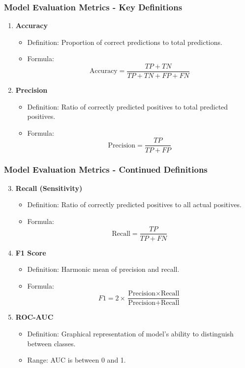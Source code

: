 \documentclass{beamer}
\begin{document}
\begin{frame}[fragile]
    \frametitle{Model Evaluation Metrics - Key Definitions}
    \begin{enumerate}
        \item \textbf{Accuracy}
            \begin{itemize}
                \item Definition: Proportion of correct predictions to total predictions.
                \item Formula: 
                \[
                \text{Accuracy} = \frac{TP + TN}{TP + TN + FP + FN}
                \]
            \end{itemize}
        \item \textbf{Precision}
            \begin{itemize}
                \item Definition: Ratio of correctly predicted positives to total predicted positives.
                \item Formula: 
                \[
                \text{Precision} = \frac{TP}{TP + FP}
                \]
            \end{itemize}
    \end{enumerate}
\end{frame}

\begin{frame}[fragile]
    \frametitle{Model Evaluation Metrics - Continued Definitions}
    \begin{enumerate}
        \setcounter{enumi}{2} %
        \item \textbf{Recall (Sensitivity)}
            \begin{itemize}
                \item Definition: Ratio of correctly predicted positives to all actual positives.
                \item Formula: 
                \[
                \text{Recall} = \frac{TP}{TP + FN}
                \]
            \end{itemize}
        \item \textbf{F1 Score}
            \begin{itemize}
                \item Definition: Harmonic mean of precision and recall.
                \item Formula: 
                \[
                F1 = 2 \times \frac{\text{Precision} \times \text{Recall}}{\text{Precision} + \text{Recall}}
                \]
            \end{itemize}
        \item \textbf{ROC-AUC}
            \begin{itemize}
                \item Definition: Graphical representation of model's ability to distinguish between classes.
                \item Range: AUC is between 0 and 1.
            \end{itemize}
    \end{enumerate}
\end{frame}
\end{document}
